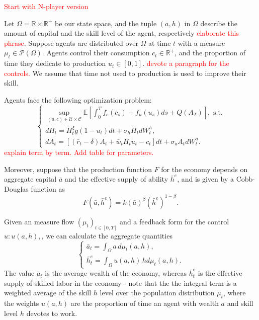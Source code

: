 
\textcolor{red}{Start with N-player version}

Let $\Omega = \mathbb{R} \times \mathbb{R}^+$ be our state space, and the tuple $(a,h)$ in $\Omega$ describe the amount of capital and the skill level of the agent, respectively \textcolor{red}{elaborate this phrase}. Suppose agents are distributed over $\Omega$ at time $t$ with a measure $\mu_t \in \mathcal{P}(\Omega)$.
Agents control their consumption $c_t \in \mathbb{R}^+$, and the proportion of time they dedicate to production $u_t \in [0,1]$. \textcolor{red}{devote a paragraph for the controls.}
We assume that time not used to production is used to improve their skill. 

Agents face the following optimization problem:
\begin{equation}
\begin{cases}
        \sup\limits_{(u,c) \in \mathcal{U} \times \mathcal{C}}\mathbb{E} [ \int_0^T f_c(c_s) + f_u(u_s) ds + Q(A_T) ], \text{ s.t.}\\
        d H_t = H^\xi_t g(1 - u_t) dt + \sigma_h H_t d W^h_t,\\
        d A_t = \left[ (\bar r_t - \delta) A_t + \bar w_t H_t u_t - c_t  \right] dt + \sigma_a A_t d W^a_t.
\end{cases}
\end{equation}
\textcolor{red}{explain term by term. Add table  for parameters.}

Moreover, suppose that the production function $F$ for the economy depends on aggregate capital $\bar a$ and the effective supply of ability $\bar h^e$, and is given by a Cobb-Douglas function \cite{Add Refernce for Cobb-Douglas} as 
$$F(\bar a,\bar h^e) = k ({\bar a})^\beta ({\bar h^e})^{1-\beta}.$$

Given an measure flow $(\mu_t)_{t \in [0,T]}$ and a feedback form for the control $u: u(a,h), $, we can calculate the aggregate quantities
\begin{equation*}
    \begin{cases}
        \bar a_t = \int_\Omega a\, d\mu_t(a,h),\\
        \bar h^e_t = \int_\Omega u(a,h)\, h d\mu_t (a,h).
    \end{cases}
\end{equation*}
The value $\bar a_t$ is the average wealth of the economy, whereas $\bar h^e_t$ is the effective supply of skilled labor in the economy - note that the the integral term is a weighted average of the skill $h$ level over the population distribution $\mu_t$, where the weights $u(a,h)$ are the proportion of time an agent with wealth $a$ and skill level $h$ devotes to work.

